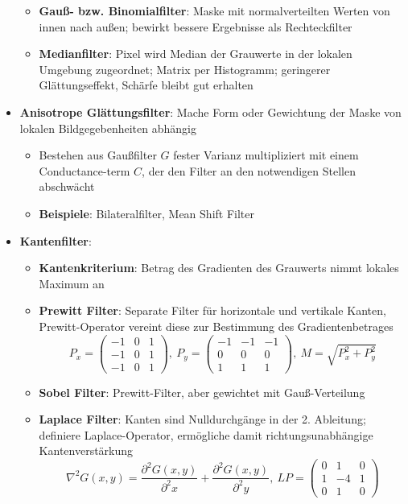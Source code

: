 \begin{itemize}
\begin{itemize}
		\item \textbf{Gauß- bzw. Binomialfilter}: Maske mit normalverteilten Werten von innen nach außen; bewirkt bessere Ergebnisse als Rechteckfilter
		\item \textbf{Medianfilter}: Pixel wird Median der Grauwerte in der lokalen Umgebung zugeordnet; Matrix per Histogramm; geringerer Glättungseffekt, Schärfe bleibt gut erhalten
	\end{itemize}
	\item \textbf{Anisotrope Glättungsfilter}: Mache Form oder Gewichtung der Maske von lokalen Bildgegebenheiten abhängig
	\begin{itemize}
		\item Bestehen aus Gaußfilter $G$ fester Varianz multipliziert mit einem Conductance-term $C$, der den Filter an den notwendigen Stellen abschwächt
		\item \textbf{Beispiele}: Bilateralfilter, Mean Shift Filter
	\end{itemize}
	\item \textbf{Kantenfilter}:
	\begin{itemize}
		\item \textbf{Kantenkriterium}: Betrag des Gradienten des Grauwerts nimmt lokales Maximum an
		\item \textbf{Prewitt Filter}: Separate Filter für horizontale und vertikale Kanten, Prewitt-Operator vereint diese zur Bestimmung des Gradientenbetrages
		$$
			P_x = \begin{pmatrix}-1 & 0 & 1\\ -1 & 0 & 1\\ -1 & 0 & 1\end{pmatrix},\ P_y = \begin{pmatrix}-1 & -1 & -1 \\ 0 & 0 & 0\\ 1 & 1 & 1\end{pmatrix},\ M = \sqrt{P_x^2 + P_y^2}
		$$
		\item \textbf{Sobel Filter}: Prewitt-Filter, aber gewichtet mit Gauß-Verteilung
		\item \textbf{Laplace Filter}: Kanten sind Nulldurchgänge in der 2. Ableitung; definiere Laplace-Operator, ermögliche damit richtungsunabhängige Kantenverstärkung
		$$
			\nabla^2G(x, y) = \frac{\partial^2G(x,y)}{\partial^2x} + \frac{\partial^2G(x, y)}{\partial^2y},\ LP = \begin{pmatrix}0 & 1 & 0\\ 1 & -4 & 1\\ 0 & 1 & 0\end{pmatrix}
$$
\end{itemize}
\end{itemize}
